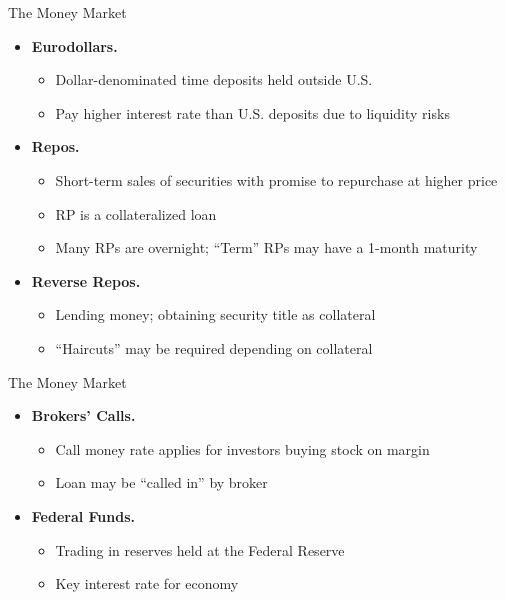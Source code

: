 \documentclass{beamer}
\begin{document}
\begin{frame}{The Money Market}
\begin{itemize}
\item[5.]\textbf{Eurodollars.} 
\begin{itemize}
\item Dollar-denominated time deposits held outside U.S.
\item Pay higher interest rate than U.S. deposits due to liquidity risks
\end{itemize}
\item[6.]\textbf{Repos.} 
\begin{itemize}
\item Short-term sales of securities with promise to repurchase at higher price
\item RP is a collateralized loan
\item Many RPs are overnight; ``Term'' RPs may have a 1-month maturity
\end{itemize}
\item[7.]\textbf{Reverse Repos.}
\begin{itemize}
\item Lending money; obtaining security title as collateral
\item ``Haircuts'' may be required depending on collateral
\end{itemize}
\end{itemize}
\end{frame}

\begin{frame}{The Money Market}
\begin{itemize}
\item[8.]\textbf{Brokers' Calls.} 
\begin{itemize}
\item Call money rate applies for investors buying stock on margin
\item Loan may be ``called in'' by broker
\end{itemize}
\item[9.]\textbf{Federal Funds.} 
\begin{itemize}
\item Trading in reserves held at the Federal Reserve
\item Key interest rate for economy
\end{itemize}
\end{itemize}
\end{frame}
\end{document}
